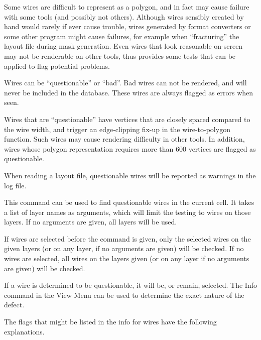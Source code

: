 Some wires are difficult to represent as a polygon, and in fact may
cause failure with some tools (and possibly not others).  Although
wires sensibly created by hand would rarely if ever cause trouble,
wires generated by format converters or some other program might cause
failures, for example when ``fracturing'' the layout file during mask
generation.  Even wires that look reasonable on-screen may not be
renderable on other tools, thus {\Xic} provides some tests that can be
applied to flag potential problems.

Wires can be ``questionable'' or ``bad''.  Bad wires can not be
rendered, and will never be included in the {\Xic} database.  These
wires are always flagged as errors when seen.

Wires that are ``questionable'' have vertices that are closely spaced
compared to the wire width, and trigger an edge-clipping fix-up in the
wire-to-polygon function.  Such wires may cause rendering difficulty
in other tools.  In addition, wires whose polygon representation
requires more than 600 vertices are flagged as questionable.

When reading a layout file, questionable wires will be reported as
warnings in the log file.

This command can be used to find questionable wires in the current
cell.  It takes a list of layer names as arguments, which will limit
the testing to wires on those layers.  If no arguments are given, all
layers will be used.

If wires are selected before the command is given, only the selected
wires on the given layers (or on any layer, if no arguments are given)
will be checked.  If no wires are selected, all wires on the layers
given (or on any layer if no arguments are given) will be checked.

If a wire is determined to be questionable, it will be, or remain,
selected.  The {\cb Info} command in the {\cb View Menu} can be used
to determine the exact nature of the defect.

The flags that might be listed in the info for wires have the
following explanations.

